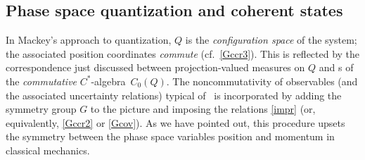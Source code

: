 \documentclass[12pt]{article}
\newcommand{\ca}{$C^*$-algebra} \newcommand{\jba}{JB-algebra}
\newcommand{\er}{\eqref}
\begin{document}
\subsection{Phase space quantization and coherent states}\label{PSQ}
In Mackey's approach to quantization, $Q$ is the {\it configuration space} of the system; 
the associated position coordinates {\it commute} (cf.\ \er{Gccr3}).
This is reflected by the correspondence just discussed between  projection-valued measures on $Q$ and \rep s of the {\it commutative} \ca\ $C_0(Q)$. The noncommutativity of observables (and the associated uncertainty relations) typical of \qm\ is incorporated by adding the symmetry group $G$ to the picture and imposing the relations \er{impr} (or, equivalently, \er{Gccr2} or \er{Gcov}). As we have pointed out, this procedure upsets the symmetry between the phase space variables position and momentum in classical mechanics. 
\end{document}
